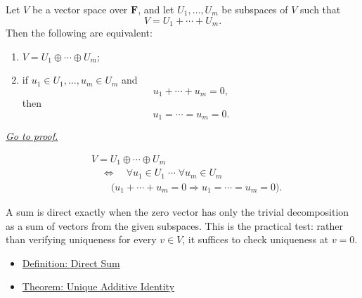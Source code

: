 \begin{tcolorbox}[colback=thmbox, colframe=thmborder, arc=2pt,
  left=6pt, right=6pt, top=4pt, bottom=4pt,
  title={\small\textbf{Theorem (Condition for a Direct Sum)}},
  fonttitle=\small\bfseries]
\begin{theorem}
\label{thm:condition-for-direct-sum}
Let $V$ be a vector space over $\mathbf{F}$, and let
$U_1,\dots,U_m$ be subspaces of $V$ such that
\[
V=U_1+\cdots+U_m.
\]
Then the following are equivalent:
\begin{enumerate}[label=(\roman*)]
  \item \(V=U_1\oplus\cdots\oplus U_m\);
  \item if \(u_1 \in U_1,\dots,u_m \in U_m\) and
        \[
        u_1+\cdots+u_m=0,
        \]
        then
        \[
        u_1=\cdots=u_m=0.
        \]
\end{enumerate}
\hyperref[prf:condition-for-direct-sum]{\textit{Go to proof.}}
\end{theorem}
\end{tcolorbox}

\begin{remark*}
\[
\begin{aligned}
&V=U_1\oplus\cdots\oplus U_m \\
&\quad\Longleftrightarrow\quad
\forall u_1 \in U_1 \;\cdots\; \forall u_m \in U_m \\
&\qquad
\bigl(u_1+\cdots+u_m=0 \Rightarrow u_1=\cdots=u_m=0\bigr).
\end{aligned}
\]
\end{remark*}

\begin{remark*}[Interpretation]
A sum is direct exactly when the zero vector has only the trivial
decomposition as a sum of vectors from the given subspaces. This is the
practical test: rather than verifying uniqueness for every $v \in V$,
it suffices to check uniqueness at $v = 0$.
\end{remark*}

\begin{remark*}[Dependencies]
\begin{itemize}
  \item \hyperref[def:direct-sum]{Definition: Direct Sum}
  \item \hyperref[thm:unique-additive-identity]{Theorem: Unique Additive Identity}
\end{itemize}
\end{remark*}

